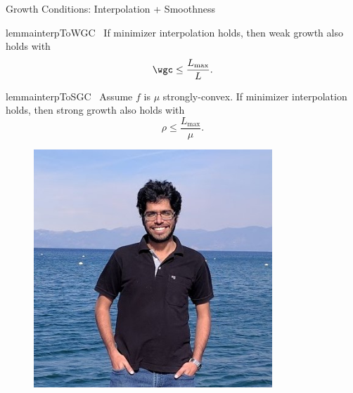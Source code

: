\documentclass[mathserif,notheorems, hyperref={colorlinks, citecolor=blue, urlcolor=blue, linkcolor=blue}]{beamer}
\begin{document}
\begin{frame}{Growth Conditions: Interpolation + Smoothness}
	\begin{center}

		\vspace{-2ex}
		\begin{minipage}[t]{0.82\textwidth}
			\vspace{-1.45ex}
			\begin{restatable}{lemma}{interpToWGC}~\label{lemma:interpolation-to-wgc}
				If minimizer interpolation holds, then weak growth also holds with
				\[ \wgc \leq \frac{L_{\text{max}}}{L}. \]
			\end{restatable}


			\begin{restatable}{lemma}{interpToSGC}~\label{lemma:interpolation-to-sgc}
				Assume \( f \) is \( \mu \) strongly-convex.
				If minimizer interpolation holds, then strong growth also holds with
				\[ \rho \leq \frac{L_{\text{max}}}{\mu}. \]
			\end{restatable}
		\end{minipage}
		\begin{minipage}[t]{0.15\textwidth}
			\begin{figure}[t]
				\centering
				\includegraphics[width=0.8\textwidth]{collaborators/sharan}

				\vspace{0.5ex}


\end{figure}
\end{minipage}
\end{center}
\end{frame}
\end{document}
